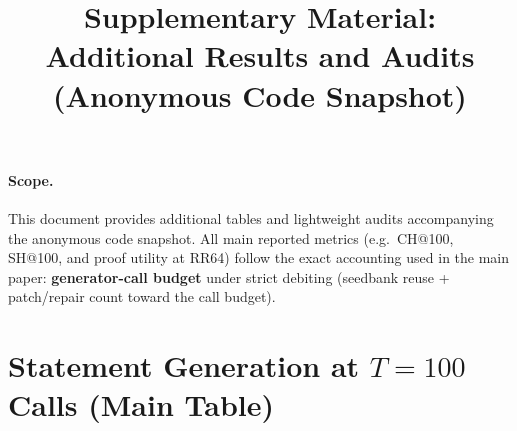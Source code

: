 \documentclass[10pt]{article}
\title{\textbf{Supplementary Material: Additional Results and Audits}\\\large (Anonymous Code Snapshot)}
\author{}
\date{}
\begin{document}
\maketitle

\paragraph{Scope.}
This document provides additional tables and lightweight audits accompanying the anonymous code snapshot.
All main reported metrics (e.g.\ CH@100, SH@100, and proof utility at RR64) follow the exact accounting used in the main paper: \textbf{generator-call budget} under strict debiting (seedbank reuse + patch/repair count toward the call budget).

\section{Statement Generation at $T{=}100$ Calls (Main Table)}
\end{document}
